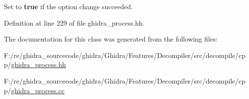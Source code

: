 Set to {\bfseries{true}} if the option change succeeded. 



Definition at line 229 of file ghidra\+\_\+process.\+hh.



The documentation for this class was generated from the following files\+:\begin{DoxyCompactItemize}
\item 
F\+:/re/ghidra\+\_\+sourcecode/ghidra/\+Ghidra/\+Features/\+Decompiler/src/decompile/cpp/\mbox{\hyperlink{ghidra__process_8hh}{ghidra\+\_\+process.\+hh}}\item 
F\+:/re/ghidra\+\_\+sourcecode/ghidra/\+Ghidra/\+Features/\+Decompiler/src/decompile/cpp/\mbox{\hyperlink{ghidra__process_8cc}{ghidra\+\_\+process.\+cc}}\end{DoxyCompactItemize}
